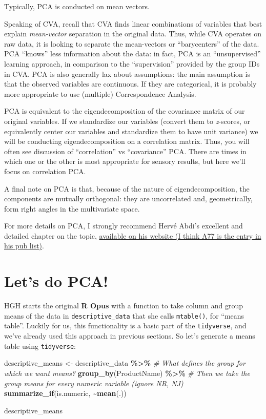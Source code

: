 \documentclass[
]{book}
\newenvironment{Shaded}{\begin{snugshade}}{\end{snugshade}}
\newcommand{\CommentTok}[1]{\textcolor[rgb]{0.56,0.35,0.01}{\textit{#1}}}
\newcommand{\FunctionTok}[1]{\textcolor[rgb]{0.13,0.29,0.53}{\textbf{#1}}}
\newcommand{\NormalTok}[1]{#1}
\newcommand{\OtherTok}[1]{\textcolor[rgb]{0.56,0.35,0.01}{#1}}
\newcommand{\SpecialCharTok}[1]{\textcolor[rgb]{0.81,0.36,0.00}{\textbf{#1}}}
\begin{document}
Typically, PCA is conducted on mean vectors.

Speaking of CVA, recall that CVA finds linear combinations of variables that best explain \emph{mean-vector} separation in the original data. Thus, while CVA operates on raw data, it is looking to separate the mean-vectors or ``barycenters'' of the data. PCA ``knows'' less information about the data: in fact, PCA is an ``unsupervised'' learning approach, in comparison to the ``supervision'' provided by the group IDs in CVA. PCA is also generally lax about assumptions: the main assumption is that the observed variables are continuous. If they are categorical, it is probably more appropriate to use (multiple) Correspondence Analysis.

PCA is equivalent to the eigendecomposition of the covariance matrix of our original variables. If we standardize our variables (convert them to \emph{z}-scores, or equivalently center our variables and standardize them to have unit variance) we will be conducting eigendecomposition on a correlation matrix. Thus, you will often see discussion of ``correlation'' vs ``covariance'' PCA. There are times in which one or the other is most appropriate for sensory results, but here we'll focus on correlation PCA.

A final note on PCA is that, because of the nature of eigendecomposition, the components are mutually orthogonal: they are uncorrelated and, geometrically, form right angles in the multivariate space.

For more details on PCA, I strongly recommend Hervé Abdi's excellent and detailed chapter on the topic, \href{https://personal.utdallas.edu/~herve/}{available on his website (I think A77 is the entry in his pub list)}.

\section{Let's do PCA!}\label{lets-do-pca}

HGH starts the original \textbf{R Opus} with a function to take column and group means of the data in \texttt{descriptive\_data} that she calls \texttt{mtable()}, for ``means table''. Luckily for us, this functionality is a basic part of the \texttt{tidyverse}, and we've already used this approach in previous sections. So let's generate a means table using \texttt{tidyverse}:

\begin{Shaded}
\begin{Highlighting}[]
\NormalTok{descriptive\_means }\OtherTok{\textless{}{-}}
\NormalTok{  descriptive\_data }\SpecialCharTok{\%\textgreater{}\%}
  \CommentTok{\# What defines the group for which we want means?}
  \FunctionTok{group\_by}\NormalTok{(ProductName) }\SpecialCharTok{\%\textgreater{}\%}
  \CommentTok{\# Then we take the group means for every numeric variable (ignore NR, NJ)}
  \FunctionTok{summarize\_if}\NormalTok{(is.numeric, }\SpecialCharTok{\textasciitilde{}}\FunctionTok{mean}\NormalTok{(.))}

\NormalTok{descriptive\_means}
\end{Highlighting}
\end{Shaded}
\end{document}
